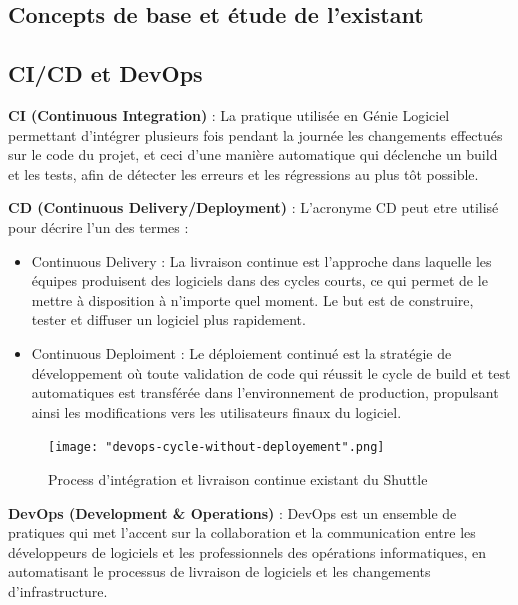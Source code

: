 \begin{spacing}{1.2}
\section{Concepts de base et étude de l’existant}
\subsection{CI/CD et DevOps}
\textbf{CI (Continuous Integration)} : La pratique utilisée en Génie Logiciel permettant d'intégrer plusieurs fois pendant la journée les changements effectués sur le code du projet, et ceci d'une manière automatique qui déclenche un build et les tests, afin de détecter les erreurs et les régressions au plus tôt possible. 

\textbf{CD (Continuous Delivery/Deployment)} : L'acronyme CD peut etre utilisé pour décrire l'un des termes : 
\begin{itemize}
    \item Continuous Delivery : La livraison continue est l'approche dans laquelle les équipes produisent des logiciels dans des cycles courts, ce qui permet de le mettre à disposition à n’importe quel moment. Le but est de construire, tester et diffuser un logiciel plus rapidement.
    \item Continuous Deploiment : Le déploiement continué est la stratégie de développement où toute validation de code qui réussit le cycle de build et test automatiques est transférée dans l'environnement de production, propulsant ainsi les modifications vers les utilisateurs finaux du logiciel.
\end{itemize}
\begin{figure}[H]\centering
\texttt{[image: "devops-cycle-without-deployement".png]}
\caption{Process d'intégration et livraison continue existant du Shuttle}
\label{fig:fig2}
\end{figure}

\textbf{DevOps (Development \& Operations)} : DevOps est un ensemble de pratiques qui met l'accent sur la collaboration et la communication entre les développeurs de logiciels et les professionnels des opérations informatiques, en automatisant le processus de livraison de logiciels et les changements d'infrastructure.


\end{spacing}
